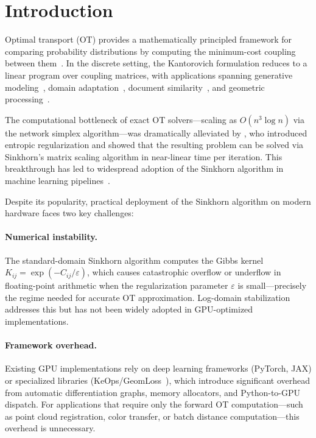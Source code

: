 
\section{Introduction}
\label{sec:introduction}

Optimal transport (OT) provides a mathematically principled framework for comparing probability distributions by computing the minimum-cost coupling between them~\citep{villani2003topics, villani2009optimal}. In the discrete setting, the Kantorovich formulation reduces to a linear program over coupling matrices, with applications spanning generative modeling~\citep{arjovsky2017wasserstein}, domain adaptation~\citep{courty2017optimal}, document similarity~\citep{kusner2015word}, and geometric processing~\citep{solomon2015convolutional}.

The computational bottleneck of exact OT solvers---scaling as $O(n^3 \log n)$ via the network simplex algorithm---was dramatically alleviated by \citet{cuturi2013sinkhorn}, who introduced entropic regularization and showed that the resulting problem can be solved via Sinkhorn's matrix scaling algorithm in near-linear time per iteration. This breakthrough has led to widespread adoption of the Sinkhorn algorithm in machine learning pipelines~\citep{peyre2019computational}.

Despite its popularity, practical deployment of the Sinkhorn algorithm on modern hardware faces two key challenges:

\paragraph{Numerical instability.} The standard-domain Sinkhorn algorithm computes the Gibbs kernel $K_{ij} = \exp(-C_{ij}/\varepsilon)$, which causes catastrophic overflow or underflow in floating-point arithmetic when the regularization parameter $\varepsilon$ is small---precisely the regime needed for accurate OT approximation. Log-domain stabilization~\citep{schmitzer2019stabilized} addresses this but has not been widely adopted in GPU-optimized implementations.

\paragraph{Framework overhead.} Existing GPU implementations rely on deep learning frameworks (PyTorch, JAX) or specialized libraries (KeOps/GeomLoss~\citep{feydy2019interpolating, charlier2021kernel}), which introduce significant overhead from automatic differentiation graphs, memory allocators, and Python-to-GPU dispatch. For applications that require only the forward OT computation---such as point cloud registration, color transfer, or batch distance computation---this overhead is unnecessary.

